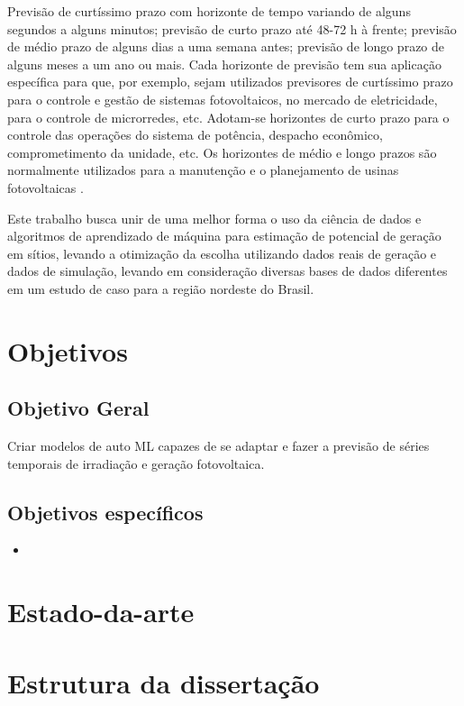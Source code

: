 Previsão de curtíssimo prazo com horizonte de tempo variando de alguns segundos a alguns minutos; previsão de curto prazo até 48-72 h à frente; previsão de médio prazo de alguns dias a uma semana antes; previsão de longo prazo de alguns meses a um ano ou mais. Cada horizonte de previsão tem sua aplicação específica para que, por exemplo, sejam utilizados previsores de curtíssimo prazo para o controle e gestão de sistemas fotovoltaicos, no mercado de eletricidade, para o controle de microrredes, etc. Adotam-se horizontes de curto prazo para o controle das operações do sistema de potência, despacho econômico, comprometimento da unidade, etc. Os horizontes de médio e longo prazos são normalmente utilizados para a manutenção e o planejamento de usinas fotovoltaicas \cite{mellit2020advanced}.

Este trabalho busca unir de uma melhor forma o uso da ciência de dados e algoritmos de aprendizado de máquina para estimação de potencial de geração em sítios, levando a otimização da escolha utilizando dados reais de geração e dados de simulação, levando em consideração diversas bases de dados diferentes em um estudo de caso para a região nordeste do Brasil.


\section{Objetivos}

\subsection{Objetivo Geral}

Criar modelos de auto ML capazes de se adaptar e fazer a previsão de séries temporais de irradiação e geração fotovoltaica.

\subsection{Objetivos específicos}

\begin{itemize}
    \item 
\end{itemize}

\section{Estado-da-arte}


\section{Estrutura da dissertação}

